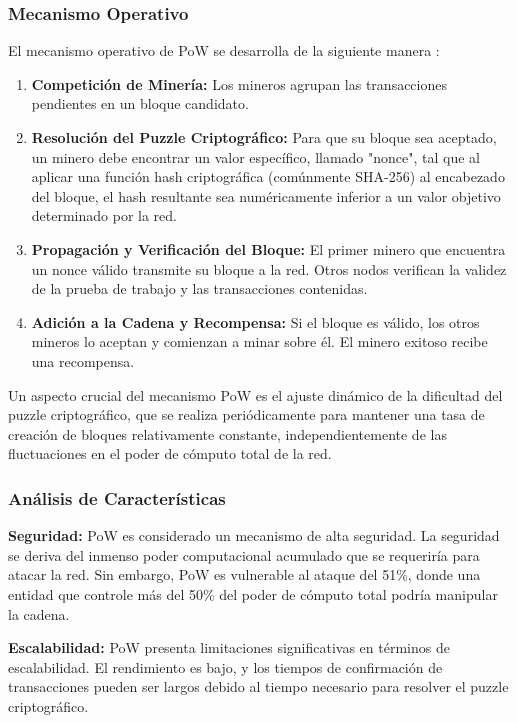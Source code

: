 \documentclass[spanish,12pt,letterpaper]{report}
\begin{document}
\subsubsection{Mecanismo Operativo}

El mecanismo operativo de PoW se desarrolla de la siguiente manera \parencite{investopedia2025pow}:

\begin{enumerate}
    \item \textbf{Competición de Minería:} Los mineros agrupan las transacciones pendientes en un bloque candidato.
    \item \textbf{Resolución del Puzzle Criptográfico:} Para que su bloque sea aceptado, un minero debe encontrar un valor específico, llamado "nonce", tal que al aplicar una función hash criptográfica (comúnmente SHA-256) al encabezado del bloque, el hash resultante sea numéricamente inferior a un valor objetivo determinado por la red.
    \item \textbf{Propagación y Verificación del Bloque:} El primer minero que encuentra un nonce válido transmite su bloque a la red. Otros nodos verifican la validez de la prueba de trabajo y las transacciones contenidas.
    \item \textbf{Adición a la Cadena y Recompensa:} Si el bloque es válido, los otros mineros lo aceptan y comienzan a minar sobre él. El minero exitoso recibe una recompensa.
\end{enumerate}

Un aspecto crucial del mecanismo PoW es el ajuste dinámico de la dificultad del puzzle criptográfico, que se realiza periódicamente para mantener una tasa de creación de bloques relativamente constante, independientemente de las fluctuaciones en el poder de cómputo total de la red.

\subsubsection{Análisis de Características}

\textbf{Seguridad:} PoW es considerado un mecanismo de alta seguridad. La seguridad se deriva del inmenso poder computacional acumulado que se requeriría para atacar la red. Sin embargo, PoW es vulnerable al ataque del 51\%, donde una entidad que controle más del 50\% del poder de cómputo total podría manipular la cadena.

\textbf{Escalabilidad:} PoW presenta limitaciones significativas en términos de escalabilidad. El rendimiento es bajo, y los tiempos de confirmación de transacciones pueden ser largos debido al tiempo necesario para resolver el puzzle criptográfico.
\end{document}
